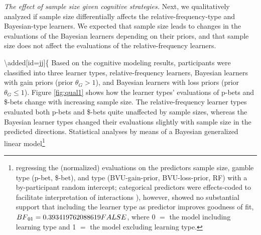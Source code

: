 \documentclass[a4paper, man, floatsintext]{apa6}
\let\rmarkdownfootnote\footnote%
\def\footnote{\protect\rmarkdownfootnote}
\begin{document}
\emph{The effect of sample size given cognitive strategies.} Next, we
qualitatively analyzed if sample size differentially affects the
relative-frequency-type and Bayesian-type learners. We expected that
sample size leads to changes in the evaluations of the Bayesian learners
depending on their priors, and that sample size does not affect the
evaluations of the relative-frequency learners. 

\textbackslash{}added{[}id=jj{]}\{ Based on the cognitive modeling
results, participants were classified into three learner types,
relative-frequency learners, Bayesian learners with gain priors (prior
\(\theta_G > 1\)), and Bayesian learners with loss priors (prior
\(\theta_G \leq 1\)). Figure \ref{fig:qual1} shows how the learner
types' evaluations of p-bets and \$-bets change with increasing sample
size. The relative-frequency learner types evaluated both p-bets and
\$-bets quite unaffected by sample sizes, whereas the Bayesian learner
types changed their evaluations slightly with sample size in the
predicted directions. Statistical analyses by means of a Bayesian
generalized linear
model\footnote{regressing the (normalized) evaluations on the predictors sample size, gamble type (p-bet, \$-bet), and type (BVU-gain-prior, BVU-loss-prior, RF) with a by-participant random intercept; categorical predictors were effects-coded to facilitate interpretation of interactions \citep[for details, see][]{SingmannForthcoming}), however, showed no substantial support that including the learner type as predictor improves goodness of fit, $BF\textsubscript{01}=0.393419762088619FALSE$, where 0 $=$ the model including learning type and 1 $=$ the model excluding learning type.
}
\end{document}
